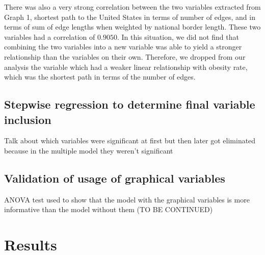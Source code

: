 \documentclass[oneside,12pt]{report}
\begin{document}
There was also a very strong correlation between the two variables extracted from Graph 1, shortest path to the United States in terms of number of edges, and in terms of sum of edge lengths when weighted by national border length. These two variables had a correlation of \begin{math}0.9050\end{math}. In this situation, we did not find that combining the two variables into a new variable was able to yield a stronger relationship than the variables on their own. Therefore, we dropped from our analysis the variable which had a weaker linear relationship with obesity rate, which was the shortest path in terms of the number of edges.

\section*{Stepwise regression to determine final variable inclusion}

Talk about which variables were significant at first but then later got eliminated because in the multiple model they weren't significant

\section*{Validation of usage of graphical variables}
ANOVA test used to show that the model with the graphical variables is more informative than the model without them (TO BE CONTINUED)

\chapter{Results}
\end{document}
